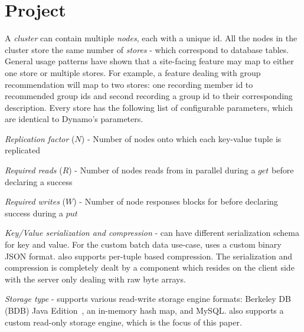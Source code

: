 \section{Project \projectname{}}
\label{sec:system_architecture}

A \projectname{} \emph{cluster} can contain multiple \emph{nodes},
each with a unique id. All the nodes in the cluster store the same
number of \emph{stores} - which correspond to database tables. General
usage patterns have shown that a site-facing feature may map to either
one store or multiple stores. For example, a feature dealing with
group recommendation will map to two stores: one recording member id
to recommended group ids and second recording a group id to their
corresponding description. Every store has the following list of
configurable parameters, which are identical to Dynamo's parameters. 
\begin{compactitem}
  \item \emph {Replication factor} ($N$) - Number of nodes onto which
each key-value tuple is replicated
  \item \emph {Required reads} ($R$) - Number of nodes \projectname{}
reads from in parallel during a $get$ before declaring a success
  \item \emph {Required writes} ($W$) - Number of node responses
\projectname{} blocks for before declaring success during a $put$
  \item \emph {Key/Value serialization and compression} - \projectname{}
can have different serialization schema for key and value. For the
custom batch data use-case, \projectname{} uses a custom binary JSON
format. \projectname{} also supports per-tuple based compression. The
serialization and compression is completely dealt by a component which
resides on the client side with the server only dealing with raw byte
arrays. 
  \item \emph {Storage type} - \projectname{} supports various
read-write storage engine formats: Berkeley DB (BDB) Java
Edition~\cite{bdb}, an in-memory hash map, and MySQL. \projectname{}
also supports a custom read-only storage engine, which is the focus of
this paper.  
\end{compactitem}

